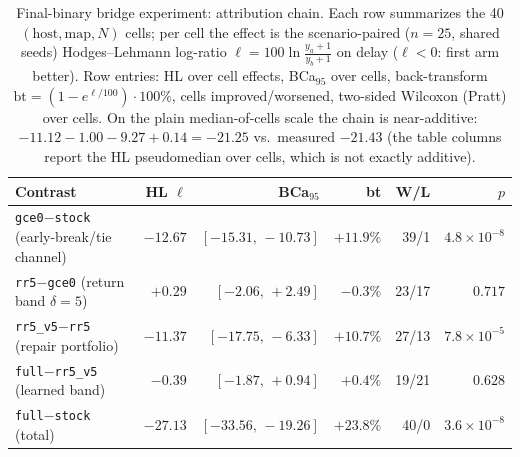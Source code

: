 \begin{table}[t]\centering\small
\caption{Final-binary bridge experiment: attribution chain. Each row summarizes
the 40 $(\text{host},\text{map},N)$ cells; per cell the effect is the
scenario-paired ($n{=}25$, shared seeds) Hodges--Lehmann log-ratio
$\ell=100\ln\!\frac{y_a+1}{y_b+1}$ on delay ($\ell<0$: first arm better).
Row entries: HL over cell effects, BCa$_{95}$ over cells, back-transform
$\mathrm{bt}=(1-e^{\ell/100})\cdot100\%$, cells improved/worsened, two-sided
Wilcoxon (Pratt) over cells. On the plain median-of-cells scale the chain is
near-additive: $-11.12-1.00-9.27+0.14=-21.25$ vs.\ measured $-21.43$ (the table
columns report the HL pseudomedian over cells, which is not exactly additive).}
\label{stab:bridge-attribution}
\begin{tabular}{@{}lrrrrr@{}}
\toprule
Contrast & HL $\ell$ & BCa$_{95}$ & bt & W/L & $p$ \\
\midrule
\texttt{gce0}$-$\texttt{stock} (early-break/tie channel) & $-12.67$ & $[-15.31,\,-10.73]$ & $+11.9\%$ & 39/1 & $4.8\!\times\!10^{-8}$ \\
\texttt{rr5}$-$\texttt{gce0} (return band $\delta{=}5$) & $+0.29$ & $[-2.06,\,+2.49]$ & $-0.3\%$ & 23/17 & $0.717$ \\
\texttt{rr5\_v5}$-$\texttt{rr5} (repair portfolio) & $-11.37$ & $[-17.75,\,-6.33]$ & $+10.7\%$ & 27/13 & $7.8\!\times\!10^{-5}$ \\
\texttt{full}$-$\texttt{rr5\_v5} (learned band) & $-0.39$ & $[-1.87,\,+0.94]$ & $+0.4\%$ & 19/21 & $0.628$ \\
\texttt{full}$-$\texttt{stock} (total) & $-27.13$ & $[-33.56,\,-19.26]$ & $+23.8\%$ & 40/0 & $3.6\!\times\!10^{-8}$ \\
\bottomrule
\end{tabular}
\end{table}
